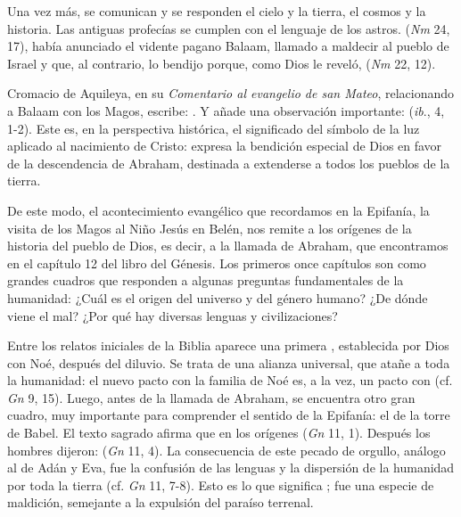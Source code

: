 {Una vez más, se comunican y se responden el cielo y la tierra, el cosmos y la historia. Las antiguas profecías se cumplen con el lenguaje de los astros.  (\emph{Nm} 24, 17), había anunciado el vidente pagano Balaam, llamado a maldecir al pueblo de Israel y que, al contrario, lo bendijo porque, como Dios le reveló,  (\emph{Nm} 22, 12).

Cromacio de Aquileya, en su \emph{Comentario al evangelio de san Mateo}, relacionando a Balaam con los Magos, escribe: . Y añade una observación importante:  (\emph{ib}., 4, 1-2). Este es, en la perspectiva histórica, el significado del símbolo de la luz aplicado al nacimiento de Cristo: expresa la bendición especial de Dios en favor de la descendencia de Abraham, destinada a extenderse a todos los pueblos de la tierra.

De este modo, el acontecimiento evangélico que recordamos en la Epifanía, la visita de los Magos al Niño Jesús en Belén, nos remite a los orígenes de la historia del pueblo de Dios, es decir, a la llamada de Abraham, que encontramos en el capítulo 12 del libro del Génesis. Los primeros once capítulos son como grandes cuadros que responden a algunas preguntas fundamentales de la humanidad: ¿Cuál es el origen del universo y del género humano? ¿De dónde viene el mal? ¿Por qué hay diversas lenguas y civilizaciones?

Entre los relatos iniciales de la Biblia aparece una primera , establecida por Dios con Noé, después del diluvio. Se trata de una alianza universal, que atañe a toda la humanidad: el nuevo pacto con la familia de Noé es, a la vez, un pacto con  (cf. \emph{Gn} 9, 15). Luego, antes de la llamada de Abraham, se encuentra otro gran cuadro, muy importante para comprender el sentido de la Epifanía: el de la torre de Babel. El texto sagrado afirma que en los orígenes  (\emph{Gn} 11, 1). Después los hombres dijeron:  (\emph{Gn} 11, 4). La consecuencia de este pecado de orgullo, análogo al de Adán y Eva, fue la confusión de las lenguas y la dispersión de la humanidad por toda la tierra (cf. \emph{Gn} 11, 7-8). Esto es lo que significa ; fue una especie de maldición, semejante a la expulsión del paraíso terrenal.

}
